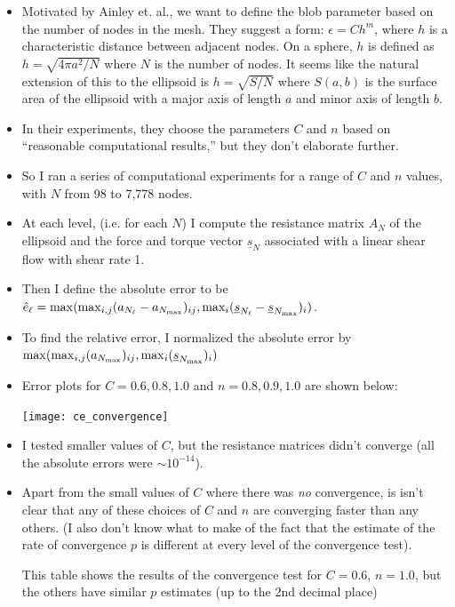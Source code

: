 \documentclass{article}
\newcommand{\tn}{\textnormal}
\begin{document}
\begin{itemize}
\item Motivated by Ainley et. al., we want to define the blob
  parameter based on the number of nodes in the mesh. They suggest a
  form: $\epsilon = C h^m$, where $h$ is a characteristic distance
  between adjacent nodes. On a sphere, $h$ is defined as $h =
  \sqrt{4\pi a^2 / N}$ where $N$ is the number of nodes. It seems like
  the natural extension of this to the ellipsoid is $h = \sqrt{S / N}$
  where $S(a, b)$ is the surface area of the ellipsoid with a major
  axis of length $a$ and minor axis of length $b$.
\item In their experiments, they choose the parameters $C$ and $n$
  based on ``reasonable computational results,'' but they don't
  elaborate further.
\item So I ran a series of computational experiments for a range of
  $C$ and $n$ values, with $N$ from 98 to 7,778 nodes. 
\item At each level, (i.e. for each $N$) I compute the resistance
  matrix $A_N$ of the ellipsoid and the force and torque vector
  $\underline{s}_N$ associated with a linear shear flow with shear
  rate 1.
\item Then I define the absolute error to be
  $\hat{e}_\ell = \max(\max_{i,j} (a_{N_\ell} - a_{N_\tn{max}})_{ij},
  \max_i (\underline{s}_{N_\ell} -
  \underline{s}_{N_\tn{max}})_i)$.
\item To find the relative error, I normalized the absolute error by
  $\max(\max_{i,j} (a_{N_\tn{max}})_{ij}, \max_i
  (\underline{s}_{N_\tn{max}})_i)$
\item Error plots for $C = 0.6, 0.8, 1.0$ and $n = 0.8, 0.9, 1.0$ are
  shown below:
  \begin{center}
    \texttt{[image: ce\_convergence]}    
  \end{center}
\item I tested smaller values of $C$, but the resistance matrices
  didn't converge (all the absolute errors were $\sim 10^{-14}$).
\item Apart from the small values of $C$ where there was \emph{no}
  convergence, is isn't clear that any of these choices of $C$ and $n$
  are converging faster than any others. (I also don't know what to
  make of the fact that the estimate of the rate of convergence $p$ is
  different at every level of the convergence test).

  This table shows the results of the convergence test for $C = 0.6$,
  $n = 1.0$, but the others have similar $p$ estimates (up to the 2nd
  decimal place)


\end{itemize}
\end{document}
